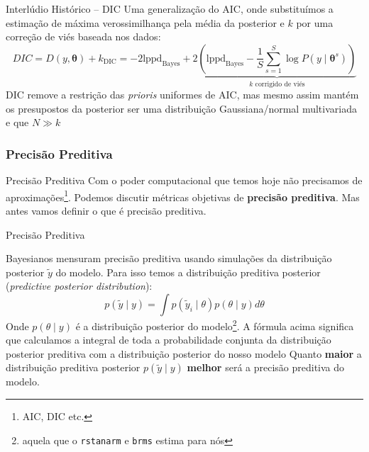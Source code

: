 \begin{frame}{Interlúdio Histórico -- DIC \parencite{spiegelhalter2002bayesian}}
	Uma generalização do AIC, onde substituímos a estimação de máxima verossimilhança
	pela média da posterior e $k$ por uma correção de viés baseada nos dados:
	$$
		DIC = D(y, \boldsymbol{\theta}) + k_{\text{DIC}} = -2 \text{lppd}_{\text{Bayes}}
		+2 \underbrace{\left( \text{lppd}_{\text{Bayes}} - \frac{1}{S} \sum^S_{s=1} \log P(y \mid \boldsymbol{\theta}^s) \right)}_{\text{$k$ corrigido de viés}}
	$$
	DIC remove a restrição das \textit{prioris} uniformes de AIC, mas mesmo assim
	mantém os presupostos da posterior ser uma distribuição Gaussiana/normal multivariada
	e que $N \gg k$
\end{frame}

\subsubsection{Precisão Preditiva}
\begin{frame}{Precisão Preditiva}
	Com o poder computacional que temos hoje não precisamos de aproximações\footnote{AIC, DIC etc.}.
	\vfill
	Podemos discutir métricas objetivas de \textbf{precisão preditiva}.
	\vfill
	Mas antes vamos definir o que é precisão preditiva.
\end{frame}

\begin{frame}{Precisão Preditiva}
	\begin{defn}
		Bayesianos mensuram precisão preditiva usando simulações da distribuição posterior
		$\tilde{y}$ do modelo. Para isso temos a distribuição preditiva posterior
		(\textit{predictive posterior distribution}):
		$$
			p(\tilde{y} \mid y) = \int p(\tilde{y}_i \mid \theta) p(\theta \mid y) d \theta
		$$
		\small
		Onde $p(\theta \mid y)$ é a distribuição posterior do modelo\footnote{aquela
			que o \texttt{rstanarm} e \texttt{brms} estima para nós}.
		A fórmula acima significa que calculamos a integral de toda a
		probabilidade conjunta da distribuição posterior preditiva com a
		distribuição posterior do nosso modelo
		\normalsize
		Quanto \textbf{maior} a distribuição preditiva posterior
		$p(\tilde{y} \mid y)$ \textbf{melhor} será a precisão preditiva do modelo.
	\end{defn}
\end{frame}

